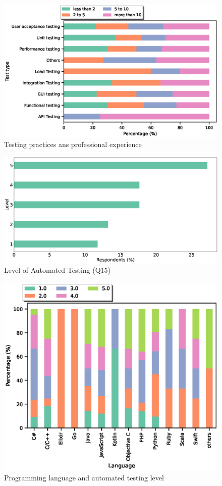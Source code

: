 \begin{figure}[h]
\centering
  \includegraphics[scale=0.6]{Figures/Testing_Type_and_Experience}
  \caption{Testing practices ans professional experience}
  \label{fig:testing type and experience}
\end{figure}
\begin{figure}[h]
\centering
  \includegraphics[scale=0.15]{Figures/Respondents_autotest_level}
  \caption{Level of Automated Testing (Q15)}
  \label{fig:autoTest}
\end{figure}
\begin{figure}[h]
\centering
  \includegraphics[scale=0.65]{Figures/Language_and_Test_Level}
  \caption{Programming language and automated testing level}
  \label{fig:language and autotest}
\end{figure}
